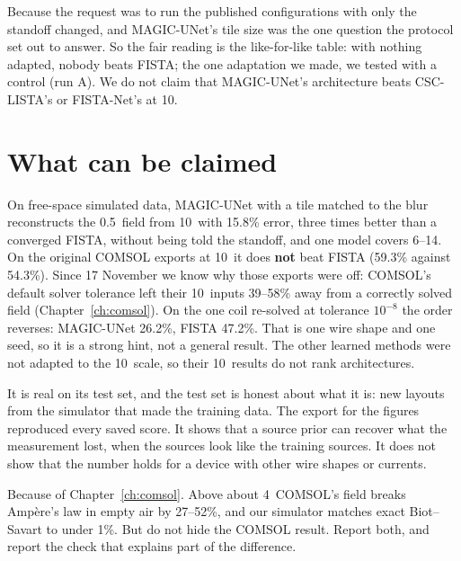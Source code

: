 \begin{defend}
Because the request was to run the published configurations with only the standoff changed, and MAGIC-UNet's tile size
was the one question the protocol set out to answer. So the fair reading is the like-for-like table: with nothing
adapted, nobody beats FISTA; the one adaptation we made, we tested with a control (run A). We do not claim that
MAGIC-UNet's architecture beats CSC-LISTA's or FISTA-Net's at 10\um.
\end{defend}

\section{What can be claimed}

\begin{keyidea}
On free-space simulated data, MAGIC-UNet with a tile matched to the blur reconstructs the 0.5\um\ field from 10\um\ with
15.8\% error, three times better than a converged FISTA, without being told the standoff, and one model covers
6--14\um. On the original COMSOL exports at 10\um\ it does \textbf{not} beat FISTA (59.3\% against 54.3\%). Since 17 November we
know why those exports were off: COMSOL's default solver tolerance left their 10\um\ inputs 39--58\% away from a
correctly solved field (Chapter~\ref{ch:comsol}). On the one coil re-solved at tolerance $10^{-8}$ the order
reverses: MAGIC-UNet 26.2\%, FISTA 47.2\%. That is one wire shape and one seed, so it is a strong hint, not a
general result.
The other learned methods were not adapted to the 10\um\ scale, so their 10\um\ results do not rank architectures.
\end{keyidea}

\begin{defend}
It is real on its test set, and the test set is honest about what it is: new layouts from the simulator that made the
training data. The export for the figures reproduced every saved score. It shows that a source prior can recover what
the measurement lost, when the sources look like the training sources. It does not show that the number holds for a
device with other wire shapes or currents.
\end{defend}

\begin{defend}
Because of Chapter~\ref{ch:comsol}. Above about 4\um\ COMSOL's field breaks Amp\`ere's law in empty air by 27--52\%, and
our simulator matches exact Biot--Savart to under 1\%. But do not hide the COMSOL result. Report both, and report the
check that explains part of the difference.
\end{defend}

